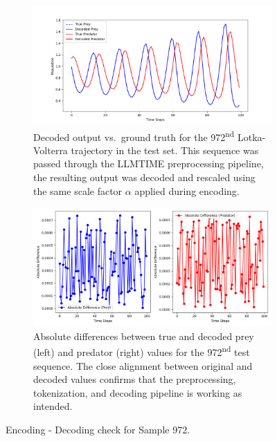 \documentclass[a4paper,12pt]{article}
\begin{document}
\begin{figure}[H]
  \centering

  \begin{subfigure}[H]{0.8\textwidth}
      \centering
      \includegraphics[width=\textwidth]{true_vs_decoded.png}
      \caption{Decoded output vs.\ ground truth for the 972\textsuperscript{nd} Lotka-Volterra trajectory in the test set. This sequence was passed through the LLMTIME preprocessing pipeline, the resulting output was decoded and rescaled using the same scale factor $\alpha$ applied during encoding.}
      \label{fig:true_vs_decoded}
  \end{subfigure}

  \vspace{0.5cm}

  \begin{subfigure}[H]{0.8\textwidth}
      \centering
      \includegraphics[width=\textwidth]{absolute_differences.png}
      \caption{Absolute differences between true and decoded prey (left) and predator (right) values for the 972\textsuperscript{nd} test sequence.  The close alignment between original and decoded values confirms that the preprocessing, tokenization, and decoding pipeline is working as intended.}
      \label{fig:absolute_differences}
  \end{subfigure}
  \vspace{0.5cm}
  \caption{ Encoding - Decoding check for Sample 972.}
  \label{fig:decoding_pipeline_evaluation}
\end{figure}
\end{document}
